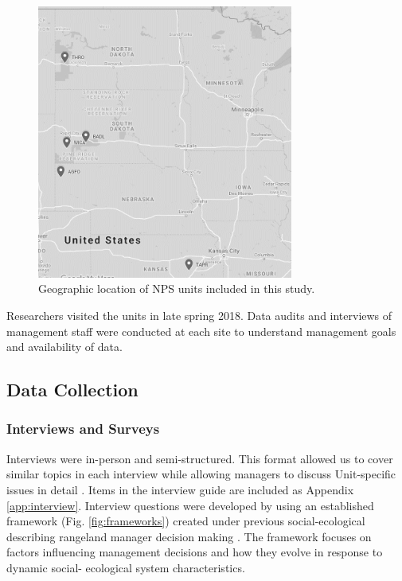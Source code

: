\begin{figure}[th]
	\centering
\includegraphics[width=0.75\textwidth]{figures/RegionMapGoogle.png}
\caption[Map of Midwest NPS units.]
	{Geographic location of NPS units included in this study.} 
\label{RegionMap}
\end{figure}

Researchers visited the units in late spring 2018. 
Data audits and interviews of management staff were conducted at each site to understand management goals and availability of data.

\hypertarget{data-collection}{%
	\subsection{Data Collection}\label{data-collection}}

\subsubsection{Interviews and Surveys} 
Interviews were in-person and semi-structured. 
This format allowed us to cover similar topics in each
interview while allowing managers to discuss Unit-specific issues in detail \citep{creswell2003, montello2012}. 
Items in the interview guide are included as Appendix \ref{app:interview}. 
Interview questions were developed by using an established framework (Fig. \ref{fig:frameworks}) created under previous social-ecological describing rangeland manager decision making \citep{lubell2013}. 
The framework focuses on factors influencing management decisions and how they evolve in response to dynamic social- ecological system characteristics.

